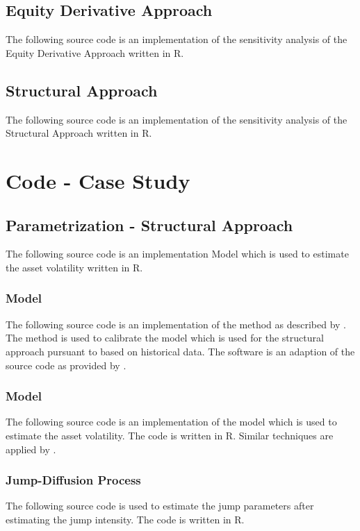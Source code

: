 \section{Equity Derivative Approach} \label{sensiequity}

The following source code is an implementation of the sensitivity analysis of the Equity Derivative Approach \citep{de2011pricing} written in R.
 


\section{Structural Approach} \label{sensistructural}

The following source code is an implementation of the sensitivity analysis of the Structural Approach \citep{pennacchi2010structural} written in R.
 


\chapter{Code - Case Study}

\section{Parametrization - Structural Approach} \label{empirical}
The following source code is an implementation \citet{merton1974pricing} Model which is used to estimate the asset volatility written in R.


\subsection{\citet{cox1985theory} Model}

The following source code is an implementation of the method as described by \citet{remillard2013statistical}. The method is used to calibrate the \citet{cox1985theory} model which is used for the structural approach pursuant to \citet{pennacchi2010structural} based on historical data. The software is an adaption of the source code as provided by \citet{calibrateCIR}.

\label{estimateCIRParameter}

\subsection{\citet{merton1974pricing} Model}
The following source code is an implementation of the \citet{merton1974pricing} model which is used to estimate the asset volatility. The code is written in R. Similar techniques are applied by \citet{stackoverflow2014code}.
\label{estimateMertonParameter}

\subsection{Jump-Diffusion Process}
The following source code is used to estimate the jump parameters after estimating the jump intensity. The code is written in R.
\label{estimateJumpsParameter}


